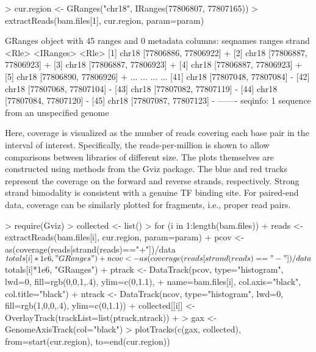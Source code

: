 \documentclass[12pt]{report}
\renewenvironment{Schunk}{\vspace{0pt}}{\vspace{0pt}}
\newcommand{\gviz}{Gviz}
\begin{document}
\begin{Schunk}
\begin{Sinput}
> cur.region <- GRanges("chr18", IRanges(77806807, 77807165))
> extractReads(bam.files[1], cur.region, param=param)
\end{Sinput}
\begin{Soutput}
GRanges object with 45 ranges and 0 metadata columns:
       seqnames               ranges strand
          <Rle>            <IRanges>  <Rle>
   [1]    chr18 [77806886, 77806922]      +
   [2]    chr18 [77806887, 77806923]      +
   [3]    chr18 [77806887, 77806923]      +
   [4]    chr18 [77806887, 77806923]      +
   [5]    chr18 [77806890, 77806926]      +
   ...      ...                  ...    ...
  [41]    chr18 [77807048, 77807084]      -
  [42]    chr18 [77807068, 77807104]      -
  [43]    chr18 [77807082, 77807119]      -
  [44]    chr18 [77807084, 77807120]      -
  [45]    chr18 [77807087, 77807123]      -
  -------
  seqinfo: 1 sequence from an unspecified genome
\end{Soutput}
\end{Schunk}

Here, coverage is visualized as the number of reads covering each base pair in the interval of interest.
Specifically, the reads-per-million is shown to allow comparisons between libraries of different size.
The plots themselves are constructed using methods from the \gviz{} package.
The blue and red tracks represent the coverage on the forward and reverse strands, respectively. 
Strong strand bimodality is consistent with a genuine TF binding site.
For paired-end data, coverage can be similarly plotted for fragments, i.e., proper read pairs.

\begin{Schunk}
\begin{Sinput}
> require(Gviz)
> collected <- list()
> for (i in 1:length(bam.files)) { 
+     reads <- extractReads(bam.files[i], cur.region, param=param)
+     pcov <- as(coverage(reads[strand(reads)=="+"])/data$totals[i]*1e6, "GRanges")
+     ncov <- as(coverage(reads[strand(reads)=="-"])/data$totals[i]*1e6, "GRanges")
+     ptrack <- DataTrack(pcov, type="histogram", lwd=0, fill=rgb(0,0,1,.4), ylim=c(0,1.1), 
+         name=bam.files[i], col.axis="black", col.title="black")
+     ntrack <- DataTrack(ncov, type="histogram", lwd=0, fill=rgb(1,0,0,.4), ylim=c(0,1.1))
+     collected[[i]] <- OverlayTrack(trackList=list(ptrack,ntrack))
+ }
> gax <- GenomeAxisTrack(col="black")
> plotTracks(c(gax, collected), from=start(cur.region), to=end(cur.region))
\end{Sinput}
\end{Schunk}
\end{document}
